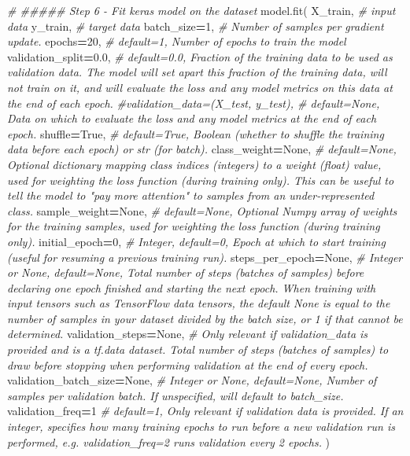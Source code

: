 \documentclass[
  a4paper,
  DIV=11,
  numbers=noendperiod]{scrreprt}
\newenvironment{Shaded}{\begin{snugshade}}{\end{snugshade}}
\newcommand{\CommentTok}[1]{\textcolor[rgb]{0.56,0.35,0.01}{\textit{#1}}}
\newcommand{\DecValTok}[1]{\textcolor[rgb]{0.00,0.00,0.81}{#1}}
\newcommand{\FloatTok}[1]{\textcolor[rgb]{0.00,0.00,0.81}{#1}}
\newcommand{\NormalTok}[1]{#1}
\newcommand{\OperatorTok}[1]{\textcolor[rgb]{0.81,0.36,0.00}{\textbf{#1}}}
\newcommand{\VariableTok}[1]{\textcolor[rgb]{0.00,0.00,0.00}{#1}}
\begin{document}
\begin{Shaded}
\begin{Highlighting}[numbers=left,,]
\CommentTok{\# \#\#\#\#\# Step 6 {-} Fit keras model on the dataset}
\NormalTok{model.fit(}
\NormalTok{    X\_train, }\CommentTok{\# input data}
\NormalTok{    y\_train, }\CommentTok{\# target data}
\NormalTok{    batch\_size}\OperatorTok{=}\DecValTok{1}\NormalTok{, }\CommentTok{\# Number of samples per gradient update.}
\NormalTok{    epochs}\OperatorTok{=}\DecValTok{20}\NormalTok{, }\CommentTok{\# default=1, Number of epochs to train the model}
\NormalTok{    validation\_split}\OperatorTok{=}\FloatTok{0.0}\NormalTok{, }\CommentTok{\# default=0.0, Fraction of the training data to be used as validation data. The model will set apart this fraction of the training data, will not train on it, and will evaluate the loss and any model metrics on this data at the end of each epoch.}
    \CommentTok{\#validation\_data=(X\_test, y\_test), \# default=None, Data on which to evaluate the loss and any model metrics at the end of each epoch.}
\NormalTok{    shuffle}\OperatorTok{=}\VariableTok{True}\NormalTok{, }\CommentTok{\# default=True, Boolean (whether to shuffle the training data before each epoch) or str (for \textquotesingle{}batch\textquotesingle{}).}
\NormalTok{    class\_weight}\OperatorTok{=}\VariableTok{None}\NormalTok{, }\CommentTok{\# default=None, Optional dictionary mapping class indices (integers) to a weight (float) value, used for weighting the loss function (during training only). This can be useful to tell the model to "pay more attention" to samples from an under{-}represented class.}
\NormalTok{    sample\_weight}\OperatorTok{=}\VariableTok{None}\NormalTok{, }\CommentTok{\# default=None, Optional Numpy array of weights for the training samples, used for weighting the loss function (during training only).}
\NormalTok{    initial\_epoch}\OperatorTok{=}\DecValTok{0}\NormalTok{, }\CommentTok{\# Integer, default=0, Epoch at which to start training (useful for resuming a previous training run).}
\NormalTok{    steps\_per\_epoch}\OperatorTok{=}\VariableTok{None}\NormalTok{, }\CommentTok{\# Integer or None, default=None, Total number of steps (batches of samples) before declaring one epoch finished and starting the next epoch. When training with input tensors such as TensorFlow data tensors, the default None is equal to the number of samples in your dataset divided by the batch size, or 1 if that cannot be determined.}
\NormalTok{    validation\_steps}\OperatorTok{=}\VariableTok{None}\NormalTok{, }\CommentTok{\# Only relevant if validation\_data is provided and is a tf.data dataset. Total number of steps (batches of samples) to draw before stopping when performing validation at the end of every epoch.}
\NormalTok{    validation\_batch\_size}\OperatorTok{=}\VariableTok{None}\NormalTok{, }\CommentTok{\# Integer or None, default=None, Number of samples per validation batch. If unspecified, will default to batch\_size.}
\NormalTok{    validation\_freq}\OperatorTok{=}\DecValTok{1} \CommentTok{\# default=1, Only relevant if validation data is provided. If an integer, specifies how many training epochs to run before a new validation run is performed, e.g. validation\_freq=2 runs validation every 2 epochs.}
\NormalTok{)}



\end{Highlighting}
\end{Shaded}
\end{document}
